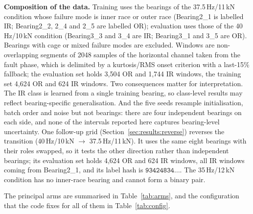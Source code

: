 \textbf{Composition of the data.} Training uses the bearings of the 37.5\,Hz/11\,kN condition whose failure mode is inner race or outer race (Bearing2\_1 is labelled IR; Bearing2\_2, 2\_4 and 2\_5 are labelled OR); evaluation uses those of the 40\,Hz/10\,kN condition (Bearing3\_3 and 3\_4 are IR; Bearing3\_1 and 3\_5 are OR). Bearings with cage or mixed failure modes are excluded. Windows are non-overlapping segments of 2048 samples of the horizontal channel taken from the fault phase, which is delimited by a kurtosis/RMS onset criterion with a last-15\% fallback; the evaluation set holds 3{,}504 OR and 1{,}744 IR windows, the training set 4{,}624 OR and 624 IR windows. Two consequences matter for interpretation. The IR class is learned from a single training bearing, so class-level results may reflect bearing-specific generalisation. And the five seeds resample initialisation, batch order and noise but not bearings: there are four independent bearings on each side, and none of the intervals reported here captures bearing-level uncertainty. One follow-up grid (Section~\ref{sec:results:reverse}) reverses the transition (40\,Hz/10\,kN $\rightarrow$ 37.5\,Hz/11\,kN). It uses the same eight bearings with their roles swapped, so it tests the other direction rather than independent bearings; its evaluation set holds 4{,}624 OR and 624 IR windows, all IR windows coming from Bearing2\_1, and its label hash is $\mathtt{93424834\ldots}$. The 35\,Hz/12\,kN condition has no inner-race bearing and cannot form a binary pair.

The principal arms are summarised in Table~\ref{tab:arms}, and the configuration that the code fixes for all of them in Table~\ref{tab:config}.

